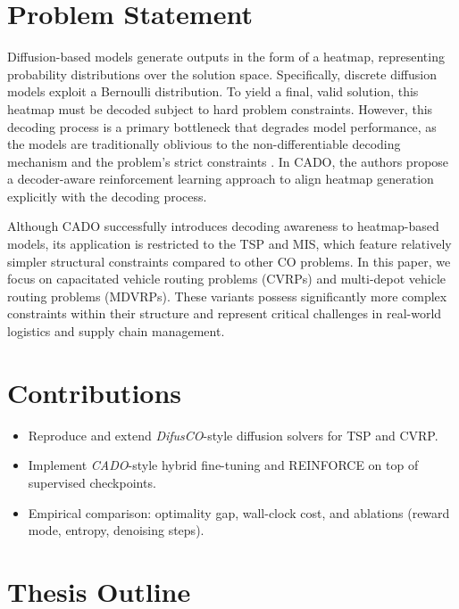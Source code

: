 \section{Problem Statement}
\label{sec:problem-statement}
Diffusion-based models generate outputs in the form of a heatmap, representing probability
distributions over the solution space. Specifically, discrete diffusion models exploit a
Bernoulli distribution. To yield a final, valid solution, this heatmap must be decoded subject
to hard problem constraints. However, this decoding process is a primary bottleneck that
degrades model performance, as the models are traditionally oblivious to the non-differentiable
decoding mechanism and the problem's strict constraints \citep{yoon2024cado}. In CADO, the authors
propose a decoder-aware reinforcement learning approach to align heatmap generation explicitly
with the decoding process.

Although CADO successfully introduces decoding awareness to heatmap-based models, its
application is restricted to the TSP and MIS, which feature relatively simpler structural
constraints compared to other CO problems. In this paper, we focus on capacitated vehicle
routing problems (CVRPs) and multi-depot vehicle routing problems (MDVRPs). These variants
possess significantly more complex constraints within their structure and represent critical
challenges in real-world logistics and supply chain management.

\section{Contributions}
\label{sec:contributions}
\begin{itemize}
  \item Reproduce and extend \emph{DifusCO}-style diffusion solvers for TSP and CVRP.
  \item Implement \emph{CADO}-style hybrid fine-tuning and REINFORCE on top of supervised checkpoints.
  \item Empirical comparison: optimality gap, wall-clock cost, and ablations (reward mode, entropy, denoising steps).
\end{itemize}

\section{Thesis Outline}
\label{sec:outline}
